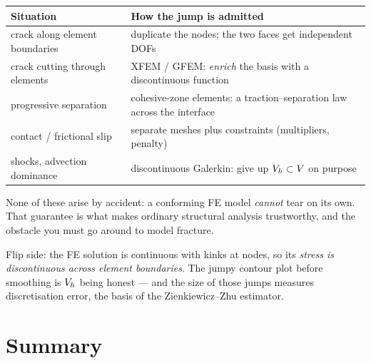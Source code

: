 \documentclass[11pt]{article}
\begin{document}
\begin{center}\small
\renewcommand{\arraystretch}{1.2}
\begin{tabular}{@{}ll@{}}
\toprule
\textbf{Situation} & \textbf{How the jump is admitted}\\
\midrule
crack along element boundaries & duplicate the nodes; the two faces get independent DOFs\\
crack cutting through elements & XFEM / GFEM: \emph{enrich} the basis with a discontinuous function\\
progressive separation         & cohesive-zone elements: a traction--separation law across the interface\\
contact / frictional slip      & separate meshes plus constraints (multipliers, penalty)\\
shocks, advection dominance    & discontinuous Galerkin: give up $V_{h}\subset V$ on purpose\\
\bottomrule
\end{tabular}
\end{center}

\noindent
None of these arise by accident: a conforming FE model \emph{cannot} tear on its
own. That guarantee is what makes ordinary structural analysis trustworthy, and
the obstacle you must go around to model fracture.

Flip side: the FE solution is continuous with kinks at nodes, so its
\emph{stress is discontinuous across element boundaries}. The jumpy contour plot
before smoothing is $V_{h}$ being honest --- and the size of those jumps measures
discretisation error, the basis of the Zienkiewicz--Zhu estimator.

\section{Summary}
\end{document}
